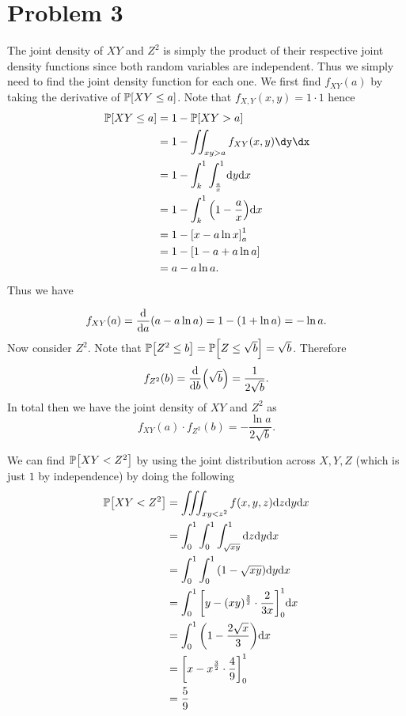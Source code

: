 \documentclass{eeleyes}
\begin{document}
\section*{Problem 3}
The joint density of $XY$ and $Z^2$ is simply the product of their respective joint density functions since both random variables are independent. Thus we simply need to find the joint density function for each one. We first find $f_{XY}(a)$ by taking the derivative of $\mathbb{P}\qty[XY \leq a]$. Note that $f_{X,Y}(x,y) = 1 \cdot 1$ hence
\begin{align*}
    \prob{XY \leq a} &= 1 - \prob{XY > a} \\
                  &= 1 - \iint_{xy > a} f_{XY}(x,y) \dy \dx \\
                  &= 1 - \int_k^1 \int_{\frac{a}{x}}^1 \dd y \dd x \\
                  &= 1 - \int_k^1 \qty(1 - \frac{a}{x}) \dd x \\
                  &= 1 - \qty[x - a \ln x]_{a}^1 \\
                  &= 1 - \qty[1 - a + a \ln a] \\
                  &= a - a \ln a
.\end{align*}
Thus we have 

\[
    f_{XY}(a) = \dv{a}\qty(a - a \ln a) = 1 - (1 + \ln a) = -\ln a   
.\]
Now consider $Z^2$. Note that $\mathbb{P}\qty[Z^2 \leq b] = \mathbb{P}\qty[Z \leq \sqrt{b}] = \sqrt{b}$. Therefore
\[
    f_{Z^2}(b) = \dv{b} \qty(\sqrt{b}) = \frac{1}{2 \sqrt{b}}
.\]
In total then we have the joint density of $XY$ and $Z^2$ as
\[
    f_{XY}(a) \cdot f_{Z^2}(b) = -\frac{\ln a}{2 \sqrt{b}}
.\]

We can find $\mathbb{P}\qty[XY < Z^2]$ by using the joint distribution across $X,Y,Z$ (which is just $1$ by independence) by doing the following
\begin{align*}
    \mathbb{P}\qty[XY < Z^2] &= \iiint_{xy < z^2} f(x,y,z) \dd z \dd y \dd x \\
                   &= \int_0^1 \int_0^1 \int_{\sqrt{xy}}^1 \dd z \dd y \dd x \\
                   &= \int_0^1 \int_0^1 \qty(1 - \sqrt{xy}) \dd y \dd x \\
                   &= \int_0^1 \qty[y - (xy)^{\frac{3}{2}} \cdot \frac{2}{3x}]_0^1 \dd x \\
                   &= \int_0^1 \qty(1 - \frac{2\sqrt{x}}{3}) \dd x \\
                   &= \qty[x - x^{\frac{3}{2}} \cdot \frac{4}{9}]_0^1 \\
                   &= \frac{5}{9}
\end{align*}
\end{document}
